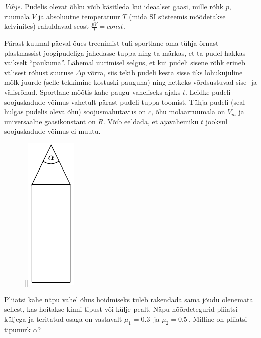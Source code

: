 \documentclass[10pt]{article}
\begin{document}
\emph{Vihje.} Pudelis olevat õhku võib käsitleda kui ideaalset gaasi, mille rõhk $p$, ruumala $V$ ja absoluutne temperatuur $T$ (mida SI süsteemis mõõdetakse kelvinites) rahuldavad seost $\tfrac{pV}{T}=\textit{const}$.
\probend
\bigskip


Pärast kuumal päeval õues treenimist tuli sportlane oma tühja õrnast plastmassist joogipudeliga jahedasse tuppa ning ta märkas, et ta pudel hakkas vaikselt \enquote{paukuma}. Lähemal uurimisel selgus, et kui pudeli sisene rõhk erineb välisest rõhust suuruse $\Delta p$ võrra, siis tekib pudeli kesta sisse üks lohukujuline mõlk juurde (selle tekkimine kostuski pauguna) ning hetkeks võrdsustuvad sise- ja välisrõhud. Sportlane mõõtis kahe paugu vaheliseks ajaks $t$. Leidke pudeli soojuskadude võimus vahetult pärast pudeli tuppa toomist. Tühja pudeli (seal hulgas pudelis oleva õhu) soojusmahutavus on $c$, õhu molaarruumala on $V_m$ ja universaalne gaasikonstant on $R$. Võib eeldada, et ajavahemiku $t$ jooksul soojuskadude võimus ei muutu.
\probend
\bigskip


\begin{figure}
\raisebox{3pt}[\dimexpr{}\baselineskip\relax]{\includegraphics[scale=0.95]{2022-lahg-02-yl.pdf}}
\vspace{-55pt}
\end{figure}
Pliiatsi kahe näpu vahel õhus hoidmiseks tuleb rakendada sama jõudu olenemata sellest, kas hoitakse kinni tipust või külje pealt. Näpu hõõrdetegurid pliiatsi küljega ja teritatud osaga on vastavalt $\mu_1 = \SI{0,3}{}$ ja $\mu_2 = \SI{0,5}{}$. Milline on pliiatsi tipunurk $\alpha$?
\probend
\bigskip
\end{document}
